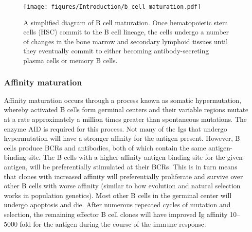 \begin{figure}[htb]
\centering\texttt{[image: figures/Introduction/b\_cell\_maturation.pdf]}
\caption[B cell maturation]{A simplified diagram of B cell maturation.
Once hematopoietic stem cells (HSC) commit to the B cell lineage, the cells undergo a number of changes in the bone marrow and secondary lymphoid tissues until they eventually commit to either becoming antibody-secreting plasma cells or memory B cells.
}
\label{fig:b_cell_mat}\end{figure}

\subsubsection{Affinity maturation}
Affinity maturation occurs through a process known as somatic hypermutation, whereby activated B cells form germinal centers and their variable regions mutate at a rate approximately a million times greater than spontaneous mutations.
The enzyme AID is required for this process.
Not many of the Igs that undergo hypermutation will have a stronger affinity for the antigen present.
However, B cells produce BCRs and antibodies, both of which contain the same antigen-binding site.
The B cells with a higher affinity antigen-binding site for the given antigen, will be preferentially stimulated at their BCRs.
This is in turn means that clones with increased affinity will preferentially proliferate and survive over other B cells with worse affinity (similar to how evolution and natural selection works in population genetics).
Most other B cells in the germinal center will undergo apoptosis and die.
After numerous repeated cycles of mutation and selection, the remaining effector B cell clones will have improved Ig affinity 10--5000 fold for the antigen during the course of the immune response\cite{mishra2018insights}.

